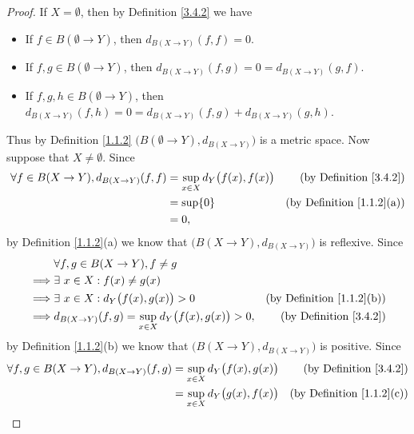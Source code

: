 \begin{proof}
    If \(X = \emptyset\), then by Definition \ref{3.4.2} we have
    \begin{itemize}
        \item If \(f \in B(\emptyset \to Y)\), then \(d_{B(X \to Y)}(f, f) = 0\).
        \item If \(f, g \in B(\emptyset \to Y)\), then \(d_{B(X \to Y)}(f, g) = 0 = d_{B(X \to Y)}(g, f)\).
        \item If \(f, g, h \in B(\emptyset \to Y)\), then \(d_{B(X \to Y)}(f, h) = 0 = d_{B(X \to Y)}(f, g) + d_{B(X \to Y)}(g, h)\).
    \end{itemize}
    Thus by Definition \ref{1.1.2} \(\big(B(\emptyset \to Y), d_{B(X \to Y)}\big)\) is a metric space.
    Now suppose that \(X \neq \emptyset\).
    Since
    \begin{align*}
        \forall f \in B(X \to Y), d_{B(X \to Y)}(f, f) & = \sup_{x \in X} d_Y\big(f(x), f(x)\big) & \text{(by Definition \ref{3.4.2})}    \\
                                                       & = \sup \{0\}                             & \text{(by Definition \ref{1.1.2}(a))} \\
                                                       & = 0,
    \end{align*}
    by Definition \ref{1.1.2}(a) we know that \(\big(B(X \to Y), d_{B(X \to Y)}\big)\) is reflexive.
    Since
    \begin{align*}
                 & \forall f, g \in B(X \to Y), f \neq g                                                                      \\
        \implies & \exists\ x \in X : f(x) \neq g(x)                                                                          \\
        \implies & \exists\ x \in X : d_Y\big(f(x), g(x)\big) > 0                     & \text{(by Definition \ref{1.1.2}(b))} \\
        \implies & d_{B(X \to Y)}(f, g) = \sup_{x \in X} d_Y\big(f(x), g(x)\big) > 0, & \text{(by Definition \ref{3.4.2})}
    \end{align*}
    by Definition \ref{1.1.2}(b) we know that \(\big(B(X \to Y), d_{B(X \to Y)}\big)\) is positive.
    Since
    \begin{align*}
        \forall f, g \in B(X \to Y), d_{B(X \to Y)}(f, g) & = \sup_{x \in X} d_Y\big(f(x), g(x)\big) & \text{(by Definition \ref{3.4.2})}    \\
                                                          & = \sup_{x \in X} d_Y\big(g(x), f(x)\big) & \text{(by Definition \ref{1.1.2}(c))} \\

\end{align*}
\end{proof}
